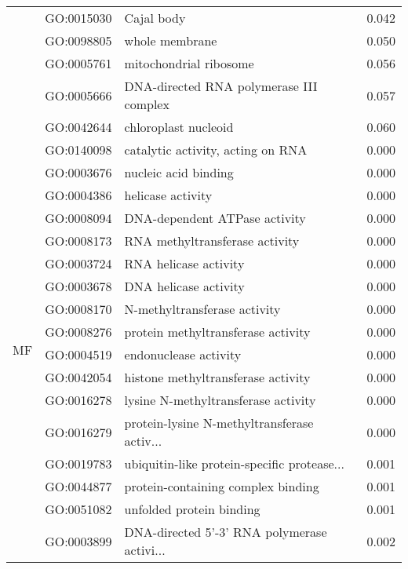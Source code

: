\begin{longtable}{lllr}
   & GO:0015030 &                                   Cajal body &         0.042 \\
   & GO:0098805 &                               whole membrane &         0.050 \\
   & GO:0005761 &                       mitochondrial ribosome &         0.056 \\
   & GO:0005666 &      DNA-directed RNA polymerase III complex &         0.057 \\
   & GO:0042644 &                         chloroplast nucleoid &         0.060 \\
\cline{1-4}
\multirow{75}{*}{MF} & GO:0140098 &            catalytic activity, acting on RNA &         0.000 \\
   & GO:0003676 &                         nucleic acid binding &         0.000 \\
   & GO:0004386 &                            helicase activity &         0.000 \\
   & GO:0008094 &                DNA-dependent ATPase activity &         0.000 \\
   & GO:0008173 &               RNA methyltransferase activity &         0.000 \\
   & GO:0003724 &                        RNA helicase activity &         0.000 \\
   & GO:0003678 &                        DNA helicase activity &         0.000 \\
   & GO:0008170 &                 N-methyltransferase activity &         0.000 \\
   & GO:0008276 &           protein methyltransferase activity &         0.000 \\
   & GO:0004519 &                        endonuclease activity &         0.000 \\
   & GO:0042054 &           histone methyltransferase activity &         0.000 \\
   & GO:0016278 &          lysine N-methyltransferase activity &         0.000 \\
   & GO:0016279 &  protein-lysine N-methyltransferase activ... &         0.000 \\
   & GO:0019783 &  ubiquitin-like protein-specific protease... &         0.001 \\
   & GO:0044877 &           protein-containing complex binding &         0.001 \\
   & GO:0051082 &                     unfolded protein binding &         0.001 \\
   & GO:0003899 &  DNA-directed 5'-3' RNA polymerase activi... &         0.002 \\

\end{longtable}
